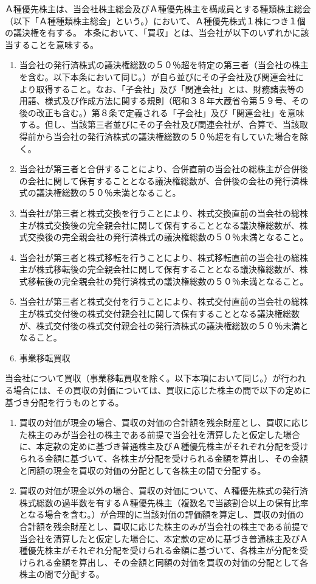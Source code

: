 \documentclass[10pt,a4paper,uplatex]{jsarticle}
\begin{document}
Ａ種優先株主は、当会社株主総会及びＡ種優先株主を構成員とする種類株主総会（以下「Ａ種種類株主総会」という。）において、Ａ種優先株式１株につき１個の議決権を有する。
本条において、「買収」とは、当会社が以下のいずれかに該当することを意味する。
\begin{enumerate}
\item 当会社の発行済株式の議決権総数の５０％超を特定の第三者（当会社の株主を含む。以下本条において同じ。）が自ら並びにその子会社及び関連会社により取得すること。なお、「子会社」及び「関連会社」とは、財務諸表等の用語、様式及び作成方法に関する規則（昭和３８年大蔵省令第５９号、その後の改正も含む。）第８条で定義される「子会社」及び「関連会社」を意味する。但し、当該第三者並びにその子会社及び関連会社が、合算で、当該取得前から当会社の発行済株式の議決権総数の５０％超を有していた場合を除く。
\item 当会社が第三者と合併することにより、合併直前の当会社の総株主が合併後の会社に関して保有することとなる議決権総数が、合併後の会社の発行済株式の議決権総数の５０％未満となること。
\item 当会社が第三者と株式交換を行うことにより、株式交換直前の当会社の総株主が株式交換後の完全親会社に関して保有することとなる議決権総数が、株式交換後の完全親会社の発行済株式の議決権総数の５０％未満となること。
\item 当会社が第三者と株式移転を行うことにより、株式移転直前の当会社の総株主が株式移転後の完全親会社に関して保有することとなる議決権総数が、株式移転後の完全親会社の発行済株式の議決権総数の５０％未満となること。
\item 当会社が第三者と株式交付を行うことにより、株式交付直前の当会社の総株主が株式交付後の株式交付親会社に関して保有することとなる議決権総数が、株式交付後の株式交付親会社の発行済株式の議決権総数の５０％未満となること。
\item 事業移転買収
\end{enumerate}
\term 当会社について買収（事業移転買収を除く。以下本項において同じ。）が行われる場合には、その買収の対価については、買収に応じた株主の間で以下の定めに基づき分配を行うものとする。
\begin{enumerate}
\item 買収の対価が現金の場合、買収の対価の合計額を残余財産とし、買収に応じた株主のみが当会社の株主である前提で当会社を清算したと仮定した場合に、本定款の定めに基づき普通株主及びＡ種優先株主がそれぞれ分配を受けられる金額に基づいて、各株主が分配を受けられる金額を算出し、その金額と同額の現金を買収の対価の分配として各株主の間で分配する。
\item 買収の対価が現金以外の場合、買収の対価について、Ａ種優先株式の発行済株式総数の過半数を有するＡ種優先株主（複数名で当該割合以上の保有比率となる場合を含む。）が合理的に当該対価の評価額を算定し、買収の対価の合計額を残余財産とし、買収に応じた株主のみが当会社の株主である前提で当会社を清算したと仮定した場合に、本定款の定めに基づき普通株主及びＡ種優先株主がそれぞれ分配を受けられる金額に基づいて、各株主が分配を受けられる金額を算出し、その金額と同額の対価を買収の対価の分配として各株主の間で分配する。
\end{enumerate}
\end{document}
